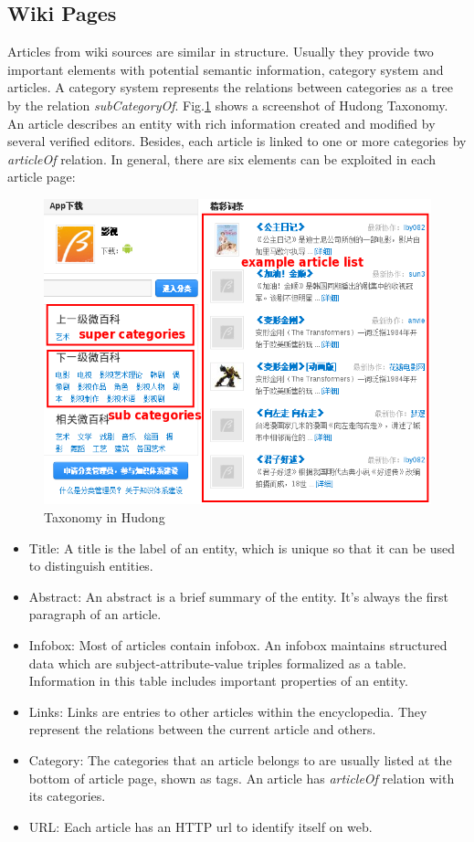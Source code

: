 \documentclass[runningheads,a4paper]{llncs}
\begin{document}
\subsection{Wiki Pages}
Articles from wiki sources are similar in structure. Usually they provide two important elements with potential semantic information, category system and articles. A category system represents the relations between categories as a tree by the relation \textit{subCategoryOf}. Fig.\ref{fig:hudong-taxonomy} shows a screenshot of Hudong Taxonomy. An article describes an entity with rich information created and modified by several verified editors. Besides, each article is linked to one or more categories by \textit{articleOf} relation. In general, there are six elements can be exploited in each article page:
\begin{figure}
    \centering
    \begin{minipage}[t]{0.8\textwidth}
        \centerline{\includegraphics[width=0.8\columnwidth]{fig/hudong-taxonomy2}}
        \caption{Taxonomy in Hudong}
        \label{fig:hudong-taxonomy}
    \end{minipage}%
\end{figure}
\begin{itemize}
  \item Title: A title is the label of an entity, which is unique so that it can be used to distinguish entities.
  \item Abstract: An abstract is a brief summary of the entity. It's always the first paragraph of an article.
  \item Infobox: Most of articles contain infobox. An infobox maintains structured data which are subject-attribute-value triples formalized as a table. Information in this table includes important properties of an entity.
  \item Links: Links are entries to other articles within the encyclopedia. They represent the relations between the current article and others.
  \item Category: The categories that an article belongs to are usually listed at the bottom of article page, shown as tags. An article has \textit{articleOf} relation with its categories.
  \item URL: Each article has an HTTP url to identify itself on web.
\end{itemize}
\end{document}
